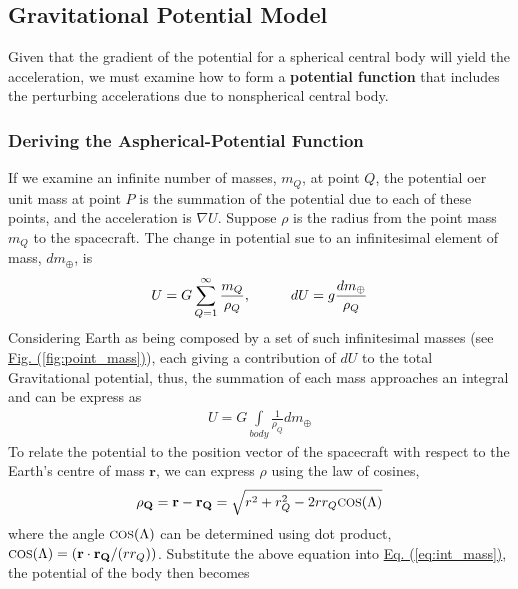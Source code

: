 \begin{multicols}{2}
\subsection{Gravitational Potential Model}
Given that the gradient of the potential for a spherical central body will yield the acceleration, we must examine how to form a \textbf{potential function} that includes the perturbing accelerations due to nonspherical central body.\par

\subsubsection{Deriving the Aspherical-Potential Function}
If we examine an infinite number of masses, $m_Q$, at point $Q$, the potential oer unit mass at point $P$ is the summation of the potential due to each of these points, and the acceleration is $\nabla U$. Suppose $\rho$ is the radius from the point mass $m_Q$ to the spacecraft. The change in potential sue to an infinitesimal element of mass, $dm_\oplus$, is
\begin{gather}
    U = G\sum_{Q=1}^{\infty}\frac{m_Q}{\rho_Q},\hspace*{1cm}dU = g\frac{dm_\oplus}{\rho_Q}
\end{gather}
Considering Earth as being composed by a set of such infinitesimal masses (see \hyperref[fig:point_mass]{Fig. (\ref*{fig:point_mass})}), each giving a contribution of $dU$ to the total Gravitational potential, thus, the summation of each mass approaches an integral and can be express as
\begin{gather}
    U = G\underset{body}{\int}\frac{1}{\rho_Q}dm_\oplus
    \label{eq:int_mass}
\end{gather}
To relate the potential to the position vector of the spacecraft with respect to the Earth's centre of mass $\mathbf{r}$, we can express $\rho$ using the law of cosines,
\begin{gather}
    \mathbf{\rho_Q} = \mathbf{r} - \mathbf{r_Q} = \sqrt{r^2+r_Q^2-2rr_Q\text{\footnotesize{COS}}(\Lambda)}
\end{gather}
where the angle $\text{\footnotesize{COS}}(\Lambda)$ can be determined using dot product, $\text{\footnotesize{COS}}(\Lambda)=(\mathbf{r}\cdot\mathbf{r_Q}/(rr_Q))$. Substitute the above equation into \hyperref[eq:int_mass]{Eq. (\ref*{eq:int_mass})}, the potential of the body then becomes
\begin{gather}
    \begin{split}

\end{split}
\end{gather}
\end{multicols}
